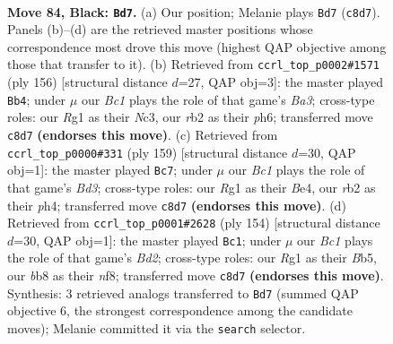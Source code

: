 \documentclass[11pt]{article}
\begin{document}
\clearpage

\begin{figure}[p]\centering
\begin{subfigure}{0.46\textwidth}\centering
\resizebox{\linewidth}{!}{%
\newchessgame
\chessboard[
  setfen={1Bb5/2N5/5k2/1P6/P3B3/3K3p/1R6/6r1 b - - 8 84},
  showmover=false,
  pgfstyle=straightmove, color=movearrow, markmove={c8-d7}
]}
\caption{}
\end{subfigure}\hfill
\begin{subfigure}{0.46\textwidth}\centering
\resizebox{\linewidth}{!}{%
\newchessgame
\chessboard[
  setfen={8/5kp1/6bp/8/7P/BnN1K1P1/8/8 w - - 4 79},
  showmover=false,
  pgfstyle=straightmove, color=movearrow, markmove={a3-b4}
]}
\caption{}
\end{subfigure}
\\[4pt]
\begin{subfigure}{0.46\textwidth}\centering
\resizebox{\linewidth}{!}{%
\newchessgame
\chessboard[
  setfen={8/8/3b3k/1B3p1p/4b2P/4P3/4K3/4B3 b - - 2 80},
  showmover=false,
  pgfstyle=straightmove, color=movearrow, markmove={d6-c7}
]}
\caption{}
\end{subfigure}\hfill
\begin{subfigure}{0.46\textwidth}\centering
\resizebox{\linewidth}{!}{%
\newchessgame
\chessboard[
  setfen={5n2/5k2/6p1/1B2K1P1/8/1b6/3B4/8 w - - 19 78},
  showmover=false,
  pgfstyle=straightmove, color=movearrow, markmove={d2-c1}
]}
\caption{}
\end{subfigure}
\caption{\textbf{Move 84, Black: \texttt{Bd7}.} (a) Our position; Melanie plays \texttt{Bd7} (\texttt{c8d7}). Panels (b)--(d) are the retrieved master positions whose correspondence most drove this move (highest QAP objective among those that transfer to it). (b) Retrieved from \texttt{ccrl\_top\_p0002\#1571} (ply 156) [structural distance $d$=27, QAP obj=3]: the master played \texttt{Bb4}; under $\mu$ our \emph{Bc1} plays the role of that game's \emph{Ba3}; cross-type roles: our \emph{R}g1 as their \emph{N}c3, our \emph{r}b2 as their \emph{p}h6; transferred move \texttt{c8d7} \textbf{(endorses this move)}. (c) Retrieved from \texttt{ccrl\_top\_p0000\#331} (ply 159) [structural distance $d$=30, QAP obj=1]: the master played \texttt{Bc7}; under $\mu$ our \emph{Bc1} plays the role of that game's \emph{Bd3}; cross-type roles: our \emph{R}g1 as their \emph{B}e4, our \emph{r}b2 as their \emph{p}h4; transferred move \texttt{c8d7} \textbf{(endorses this move)}. (d) Retrieved from \texttt{ccrl\_top\_p0001\#2628} (ply 154) [structural distance $d$=30, QAP obj=1]: the master played \texttt{Bc1}; under $\mu$ our \emph{Bc1} plays the role of that game's \emph{Bd2}; cross-type roles: our \emph{R}g1 as their \emph{B}b5, our \emph{b}b8 as their \emph{n}f8; transferred move \texttt{c8d7} \textbf{(endorses this move)}. Synthesis: 3 retrieved analogs transferred to \texttt{Bd7} (summed QAP objective 6, the strongest correspondence among the candidate moves); Melanie committed it via the \texttt{search} selector.}
\label{fig:thought-m167}
\end{figure}
\end{document}
